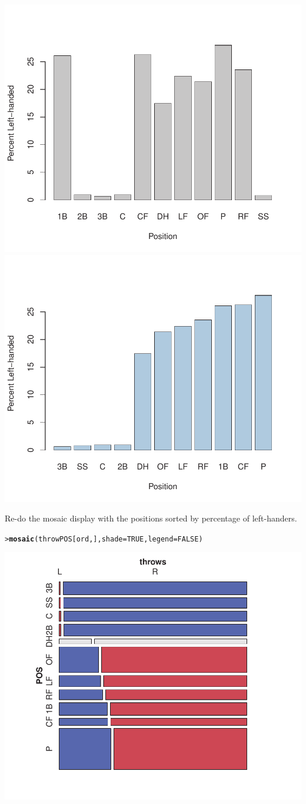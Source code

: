 \documentclass[10pt]{report}\usepackage[]{graphicx}\usepackage[]{color}
\makeatletter
\newcommand{\hlnum}[1]{\textcolor[rgb]{0.686,0.059,0.569}{#1}}%
\newcommand{\hlstd}[1]{\textcolor[rgb]{0.345,0.345,0.345}{#1}}%
\newcommand{\hlkwc}[1]{\textcolor[rgb]{0.333,0.667,0.333}{#1}}%
\newcommand{\hlkwd}[1]{\textcolor[rgb]{0.737,0.353,0.396}{\textbf{#1}}}%
\newenvironment{kframe}{%
 \def\at@end@of@kframe{}%
 \ifinner\ifhmode%
  \def\at@end@of@kframe{\end{minipage}}%
  \begin{minipage}{\columnwidth}%
 \fi\fi%
 \def\FrameCommand##1{\hskip\@totalleftmargin \hskip-\fboxsep
 \colorbox{shadecolor}{##1}\hskip-\fboxsep
     \hskip-\linewidth \hskip-\@totalleftmargin \hskip\columnwidth}%
 \MakeFramed {\advance\hsize-\width
   \@totalleftmargin\z@ \linewidth\hsize
   \@setminipage}}%
 {\par\unskip\endMakeFramed%
 \at@end@of@kframe}
\newenvironment{knitrout}{}{} %
\renewenvironment{knitrout}{\small\renewcommand{\baselinestretch}{.85}}{} %
\makeatother
\begin{document}
\begin{Exercises}
\begin{enumerate*}
\begin{ans}
\begin{knitrout}
\centerline{\includegraphics[width=.5\textwidth]{soln/fig/ex5_4b-1} 
\includegraphics[width=.5\textwidth]{soln/fig/ex5_4b-2} }



\end{knitrout}

    \end{ans}
    
    \item Re-do the mosaic display with the positions sorted by percentage of left-handers.
    \begin{ans}
\begin{knitrout}\footnotesize
{}\color{fgcolor}\begin{kframe}
\begin{alltt}
\hlstd{> }\hlkwd{mosaic}\hlstd{(throwPOS[ord,],} \hlkwc{shade}\hlstd{=}\hlnum{TRUE}\hlstd{,} \hlkwc{legend}\hlstd{=}\hlnum{FALSE}\hlstd{)}
\end{alltt}
\end{kframe}

\centerline{\includegraphics[width=.5\textwidth]{soln/fig/ex5_4c-1} }




\end{knitrout}
\end{ans}
\end{enumerate*}
\end{Exercises}
\end{document}
